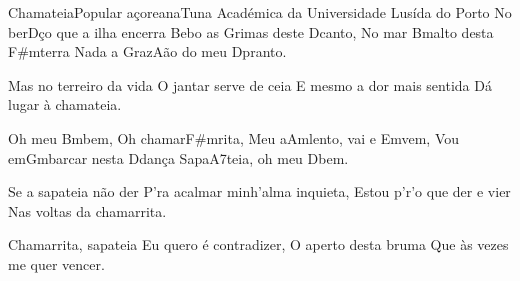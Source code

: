 \begin{musica}{Chamateia}{Popular açoreana}{Tuna Académica da Universidade Lusída do Porto}
No ber\ac{D}{ço} que a ilha encerra
Bebo as \ac{G}{ri}mas deste \ac{D}{can}to,
No mar \ac{Bm}{al}to desta \ac{F#m}{te}rra
Nada a \ac{G}{ra}z\ac{A}{ão} do meu \ac{D}{pran}to.

Mas no terreiro da vida
O jantar serve de ceia
E mesmo a dor mais sentida
Dá lugar à chamateia.

Oh meu \ac{Bm}{bem},
Oh chamar\ac{F#m}{ri}ta,
Meu a\ac{Am}{len}to, vai e \ac{Em}{vem},
Vou em\ac{Gm}{bar}car nesta \ac{D}{dan}ça
Sapa\ac{A7}{teia}, oh meu \ac{D}{bem}.

Se a sapateia não der
P’ra acalmar minh’alma inquieta,
Estou p’r’o que der e vier
Nas voltas da chamarrita.

Chamarrita, sapateia
Eu quero é contradizer,
O aperto desta bruma
Que às vezes me quer vencer.


\end{musica}
